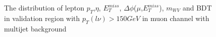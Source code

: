 \begin{figure}[ht]
	\caption{The distribution of lepton $p_{T}$,$\eta$, $E_{T}^{miss}$, $\Delta\phi$($\mu$,$E_{T}^{miss}$), $m_{WV}$ and BDT in validation region with $p_{T}(l\nu)>150 GeV$ in muon channel with multijet background}
	\label{fig:FakeVR1_mu}
\end{figure}
\clearpage
